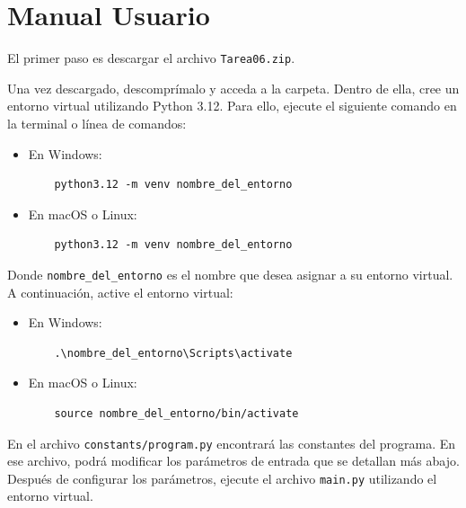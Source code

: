 \documentclass{article}
\begin{document}

\section{Manual Usuario}\label{sec:man_u}

El primer paso es descargar el archivo \texttt{Tarea06.zip}.

Una vez descargado, descomprímalo y acceda a la carpeta. Dentro de ella, cree un 
entorno virtual utilizando Python 3.12. Para ello, ejecute el siguiente comando en 
la terminal o línea de comandos:

\begin{itemize}
  \item En Windows:
  \begin{verbatim}
    python3.12 -m venv nombre_del_entorno
  \end{verbatim}
  \item En macOS o Linux:
  \begin{verbatim}
    python3.12 -m venv nombre_del_entorno
  \end{verbatim}
\end{itemize}

Donde \texttt{nombre\_del\_entorno} es el nombre que desea asignar a su entorno virtual. 
A continuación, active el entorno virtual:

\begin{itemize}
  \item En Windows:
  \begin{verbatim}
    .\nombre_del_entorno\Scripts\activate
  \end{verbatim}
  \item En macOS o Linux:
  \begin{verbatim}
    source nombre_del_entorno/bin/activate
  \end{verbatim}
\end{itemize}

En el archivo \texttt{constants/program.py} encontrará las constantes del programa. 
En ese archivo, podrá modificar los parámetros de entrada que se detallan más abajo.\\

Después de configurar los parámetros, ejecute el archivo \texttt{main.py} utilizando 
el entorno virtual.
\end{document}
